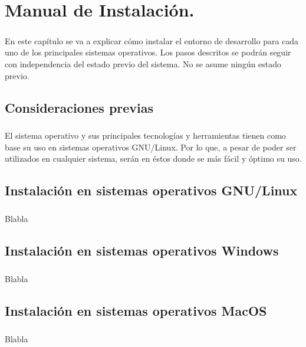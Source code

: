 \chapter{Manual de Instalación.}\label{sec:ManualDeInstalacion}

\paragraph{}En este capítulo se va a explicar cómo instalar el entorno de desarrollo
para cada uno de los principales sistemas operativos. Los pasos descritos se podrán
seguir con independencia del estado previo del sistema. No se asume ningún estado previo.

\section{Consideraciones previas}

\paragraph{}El sistema operativo y sus principales tecnologías y herramientas tienen
como base su uso en sistemas operativos GNU/Linux. Por lo que, a pesar de poder ser
utilizados en cualquier sistema, serán en éstos donde se más fácil y óptimo su uso.

\section{Instalación en sistemas operativos GNU/Linux}

\paragraph{}Blabla

\section{Instalación en sistemas operativos Windows}

\paragraph{}Blabla

\section{Instalación en sistemas operativos MacOS}

\paragraph{}Blabla


